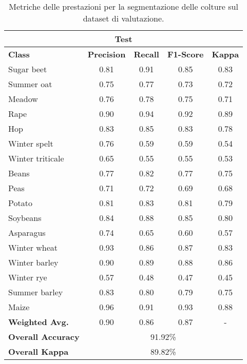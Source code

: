 \begin{table}[H]
    \centering
    \setlength{\tabcolsep}{5pt} %
    \renewcommand{\arraystretch}{1.2} %
    \begin{tabular}{|l||c|c|c|c||}
    \hline
    \multicolumn{5}{|c|}{\textbf{Test}} \\
    \hline
    \textbf{Class} & \textbf{Precision} & \textbf{Recall} & \textbf{F1-Score} & \textbf{Kappa} \\
    \hline
    Sugar beet      & 0.81 & 0.91 & 0.85 & 0.83 \\
    Summer oat      & 0.75 & 0.77 & 0.73 & 0.72 \\
    Meadow          & 0.76 & 0.78 & 0.75 & 0.71 \\
    Rape            & 0.90 & 0.94 & 0.92 & 0.89 \\
    Hop             & 0.83 & 0.85 & 0.83 & 0.78 \\
    Winter spelt    & 0.76 & 0.59 & 0.59 & 0.54 \\
    Winter triticale & 0.65 & 0.55 & 0.55 & 0.53 \\
    Beans           & 0.77 & 0.82 & 0.77 & 0.75 \\
    Peas            & 0.71 & 0.72 & 0.69 & 0.68 \\
    Potato          & 0.81 & 0.83 & 0.81 & 0.79 \\
    Soybeans        & 0.84 & 0.88 & 0.85 & 0.80 \\
    Asparagus       & 0.74 & 0.65 & 0.60 & 0.57 \\
    Winter wheat    & 0.93 & 0.86 & 0.87 & 0.83 \\
    Winter barley   & 0.90 & 0.89 & 0.88 & 0.86 \\
    Winter rye      & 0.57 & 0.48 & 0.47 & 0.45 \\
    Summer barley   & 0.83 & 0.80 & 0.79 & 0.75 \\
    Maize           & 0.96 & 0.91 & 0.93 & 0.88 \\
    \hline
    \textbf{Weighted Avg.} & 0.90 & 0.86 & 0.87 & - \\
    \hline
    \textbf{Overall Accuracy} & \multicolumn{4}{|c||}{91.92\%} \\
    \textbf{Overall Kappa}    & \multicolumn{4}{|c||}{89.82\%} \\
    \hline
    \end{tabular}
    \caption{Metriche delle prestazioni per la segmentazione delle colture sul 
    dataset di valutazione.}
    \label{tab:crop_segmentation_2016_test}
\end{table}


